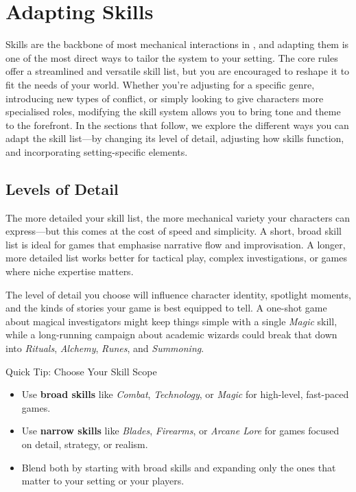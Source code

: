 
\section{Adapting Skills}\label{toolbox:sec:adapting-skills}

Skills are the backbone of most mechanical interactions in \wyrd, and adapting them is one of the most direct ways to tailor the system to your setting. The core rules offer a streamlined and versatile skill list, but you are encouraged to reshape it to fit the needs of your world. Whether you're adjusting for a specific genre, introducing new types of conflict, or simply looking to give characters more specialised roles, modifying the skill system allows you to bring tone and theme to the forefront. In the sections that follow, we explore the different ways you can adapt the skill list—by changing its level of detail, adjusting how skills function, and incorporating setting-specific elements.

\subsection{Levels of Detail}\label{toolbox:detailed-skill-lists}

The more detailed your skill list, the more mechanical variety your characters can express—but this comes at the cost of speed and simplicity. A short, broad skill list is ideal for games that emphasise narrative flow and improvisation. A longer, more detailed list works better for tactical play, complex investigations, or games where niche expertise matters.

The level of detail you choose will influence character identity, spotlight moments, and the kinds of stories your game is best equipped to tell. A one-shot game about magical investigators might keep things simple with a single \textit{Magic} skill, while a long-running campaign about academic wizards could break that down into \textit{Rituals}, \textit{Alchemy}, \textit{Runes}, and \textit{Summoning}.

\begin{CommentBox}{Quick Tip: Choose Your Skill Scope}
    \begin{itemize}
        \item Use \textbf{broad skills} like \textit{Combat}, \textit{Technology}, or \textit{Magic} for high-level, fast-paced games.
        \item Use \textbf{narrow skills} like \textit{Blades}, \textit{Firearms}, or \textit{Arcane Lore} for games focused on detail, strategy, or realism.
        \item Blend both by starting with broad skills and expanding only the ones that matter to your setting or your players.
    \end{itemize}
\end{CommentBox}

